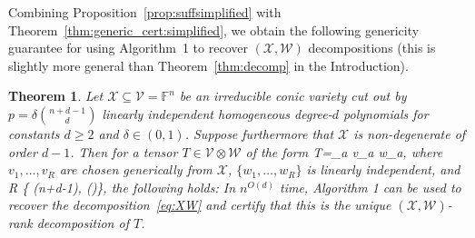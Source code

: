 \documentclass[11pt]{article}
\newtheorem{theorem}{Theorem}
\theoremstyle{definition}
\newcommand{\field}{\mathbb{F}}
\newcommand\X{\mathcal{X}}
\newcommand\W{\mathcal{W}}
\newcommand\B{\mathcal{B}}
\newcommand\V{\mathcal{V}}
\DeclareMathOperator{\spn}{span}
\newcommand{\anote}[1]{}
\def\ba#1\ea{\begin{align}#1\end{align}}
\begin{document}
Combining Proposition~\ref{prop:suffsimplified} with Theorem~\ref{thm:generic_cert:simplified}, we obtain the following genericity guarantee for using Algorithm~1 to recover $(\X,\W)$ decompositions (this is slightly more general than Theorem~\ref{thm:decomp} in the Introduction).




\begin{theorem}\label{cor:generic_decomp}
Let $\X \subseteq \V=\field^n$ be an irreducible conic variety cut out by $p=\delta \binom{n+d-1}{d}$ linearly independent homogeneous degree-$d$ polynomials for constants $d \ge 2$ and $\delta\in(0,1)$. Suppose furthermore that $\X$ is non-degenerate of order $d-1$. 
Then for a tensor $T \in \V \otimes \W$ of the form
\ba\label{eq:XW}
T=\sum_{a \in [R]} v_a \otimes w_a,
\ea
where $v_1,\dots, v_R$ are chosen generically from $\X$, $\{w_1,\dots, w_R\}$ is linearly independent, and
\ba\label{eq:XW_R}
R \leq \min\Big\{ \cdot (n+d-1), \dim(\W)\Big\},
\ea
the following holds: In $n^{O(d)}$ time, Algorithm 1 can be used to recover the decomposition~\eqref{eq:XW} and certify that this is the unique $(\X,\W)$-rank decomposition of $T$.
%
\end{theorem}
\end{document}
